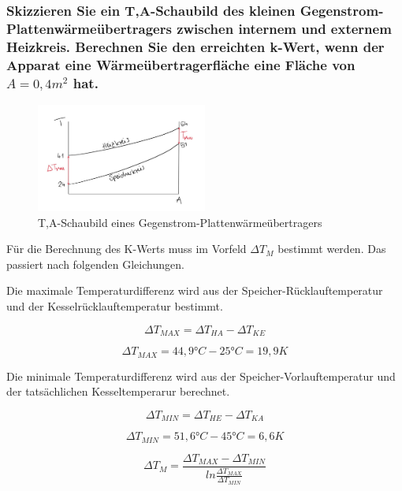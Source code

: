 \subsubsection{Skizzieren Sie ein T,A-Schaubild des kleinen Gegenstrom-Plattenwärmeübertragers
zwischen internem und externem Heizkreis. Berechnen Sie den erreichten k-Wert,
wenn der Apparat eine Wärmeübertragerfläche eine Fläche von \texorpdfstring{$A = 0,4 m^2$}{} hat.}

\begin{figure}[!ht]
    \centering
    \includegraphics[width=0.5\textwidth]{Abbildungen/TA_Diagramm.jpg}
    \caption{T,A-Schaubild eines Gegenstrom-Plattenwärmeübertragers}
    \label{fig:TA,Diagramm}
\end{figure}

Für die Berechnung des K-Werts muss im Vorfeld $\Delta T_M$ bestimmt werden. Das passiert nach folgenden Gleichungen.

Die maximale Temperaturdifferenz wird aus der Speicher-Rücklauftemperatur und der Kesselrücklauftemperatur bestimmt.

\begin{equation}
    \Delta T_{MAX}= \Delta T_{HA}-\Delta T_{KE}
    \label{eq:230621_DeltaTMAX}
\end{equation}



$$\Delta T_{MAX}= 44,9\text{°}C-25 \text{°} C= 19,9K$$

Die minimale Temperaturdifferenz wird aus der Speicher-Vorlauftemperatur und der tatsächlichen Kesseltemperarur berechnet.

\begin{equation}
    \Delta T_{MIN}= \Delta T_{HE}-\Delta T_{KA}
    \label{eq:230621_DeltaTMIN}
\end{equation}

$$\Delta T_{MIN}= 51,6 \text{°} C-45 \text{°} C= 6,6K$$

\begin{equation}
    \Delta T_{M}= \frac{\Delta T_{MAX}-\Delta T_{MIN}}{ln\frac{\Delta T_{MAX}}{\Delta T_{MIN}}}
    \label{eq:230621_DeltaTM}
\end{equation}

